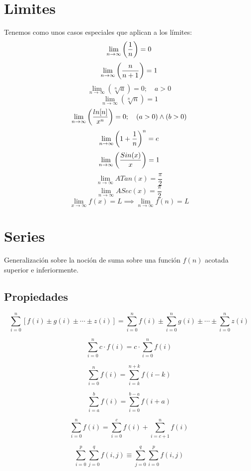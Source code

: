 \section{Limites}
Tenemos como unos casos especiales que aplican a los límites:
$$
	\lim_{n\to\infty}\left( \frac1n \right)=0
$$
$$
	\lim_{n\to\infty}\left( \frac n{n+1} \right)=1
$$
$$
	\lim_{n\to\infty}(\sqrt[n]{a})=0;\quad a>0
$$
$$
	\lim_{n\to\infty}(\sqrt[n]{n})=1
$$
$$
	\lim_{n\to\infty}\left( \frac{ln[n]}{x^n} \right)=0;\quad(a>0)\land (b>0)
$$
$$
	\lim_{n\to\infty}\left( 1+\frac1n \right)^n=e
$$
$$
	\lim_{n\to\infty}\left( \frac{Sin(x)}x \right)=1
$$
$$
	\lim_{n\to\infty}ATan(x)=\frac{\pi}2
$$
$$
	\lim_{n\to\infty}ASec(x)=\frac{\pi}2
$$
$$
	\lim_{x\to\infty}f(x)=L
	\implies
	\lim_{n\to\infty}f(n)=L
$$

\section{Series}
Generalización sobre la noción de suma sobre una función $f(n)$ acotada superior e inferiormente.

\subsection{Propiedades}
\begin{theorem}
	$$
		\sum_{i=0}^n[f(i)\pm g(i)\pm\cdots\pm z(i)]
		= \sum_{i=0}^nf(i)\pm \sum_{i=0}^ng(i)\pm\cdots\pm\sum_{i=0}^nz(i)
	$$
\end{theorem}

\begin{theorem}[Constantes]
	$$ \sum_{i=0}^nc\cdot f(i) = c\cdot\sum_{i=0}^nf(i) $$
\end{theorem}

\begin{theorem}
	$$ \sum_{i=0}^nf(i) = \sum_{i=k}^{n+k}f(i-k) $$
\end{theorem}

\begin{theorem}[Índice a 0]
	$$ \sum_{i=a}^bf(i) = \sum_{i=0}^{b-a}f(i+a) $$
\end{theorem}

\begin{theorem}[Partición]
	$$ \sum_{i=0}^nf(i) = \sum_{i=0}^cf(i)+\sum_{i=c+1}^nf(i) $$
\end{theorem}

\begin{theorem}[Dobles]
	$$
		\sum_{i=0}^p\sum_{j=0}^qf(i,j)
		\equiv \sum_{j=0}^q\sum_{i=0}^pf(i,j)
	$$
\end{theorem}


